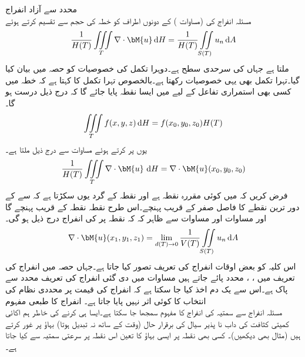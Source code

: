 \quad محدد سے آزاد انفراج\\
مسئلہ انفراج کی (مساوات ) کے دونوں اطراف کو خطہ  کی حجم  سے تقسیم کرتے ہوئے
\begin{align}\label{مساوات_خطی_تکمل_پھیلاو_مثال_الف}
\frac{1}{H(T)}\iiint\limits_T \nabla \cdot \bM{u}\dif H=\frac{1}{H(T)}\iint\limits_{S(T)}u_n \dif A
\end{align}
ملتا ہے جہاں  کی سرحدی سطح  ہے۔دوہرا تکمل کی خصوصیات کو حصہ  میں بیان کیا گیا۔تہرا تکمل بھی یہی خصوصیات رکھتا ہے۔بالخصوص تہرا تکمل کا  کہتا ہے کہ خطہ  میں کسی بھی استمراری تفاعل   کے لیے  میں ایسا نقطہ  پایا جائے گا کہ درج ذیل درست ہو گا۔
\begin{align*}
\iiint\limits_T f(x,y,z)\dif H=f(x_0,y_0,z_0) H(T)
\end{align*} 
یوں  پر کرتے ہوئے مساوات  سے درج ذیل ملتا ہے۔
\begin{align}\label{مساوات_خطی_تکمل_پھیلاو_مثال_ب}
\frac{1}{H(T)}\iiint\limits_T \nabla \cdot \bM{u}\, \dif H=\nabla \cdot \bM{u}(x_0,y_0,z_0)
\end{align}
فرض کریں کہ  میں  کوئی مقررہ نقطہ ہے اور  نقطہ  کے گرد یوں سکڑتا ہے کہ  سے  کے  دور ترین نقطے کا فاصل  صفر کے قریب پہنچے۔اس طرح نقطہ  نقطہ  کے قریب پہنچے گا اور مساوات  اور مساوات  سے ظاہر کہ کہ نقطہ  پر  کی انفراج درج ذیل ہو گی۔
\begin{align}\label{مساوات_خطی_تکمل_پھیلاو_مثال_پ}
\nabla \cdot \bM{u}(x_1,y_1,z_1)=\lim_{d(T)\to 0}\frac{1}{V(T)}\iint\limits_{S(T)}u_n\dif A
\end{align}
اس کلیہ کو بعض اوقات انفراج کی تعریف تصور کیا جاتا ہے۔جہاں حصہ  میں انفراج کی تعریف میں ، ،  محدد پائے جاتے ہیں مساوات  میں دی گئی انفراج کی تعریف محدد سے پاک ہے۔اس سے یک دم اخذ کیا جا سکتا ہے کہ انفراج کی قیمت پر محددی نظام کی انتخاب کا کوئی اثر نہیں پایا جاتا ہے۔
\quad انفراج کا طبعی مفہوم\\
مسئلہ انفراج سے سمتیہ کی انفراج کا مفہوم سمجھا جا سکتا ہے۔ایسا ہی کرنے کی خاطر ہم اکائی کمیتی کثافت  کی  داب نا پذیر  سیال کی برقرار حال (وقت کے ساتھ نہ تبدیل ہوتا) بہاؤ پر غور کرتے ہیں (مثال  بھی دیکھیں)۔ کسی بھی نقطہ  پر ایسی بہاؤ کا تعین اس نقطہ پر سرعتی سمتیہ  سے کیا جاتا ہے۔

